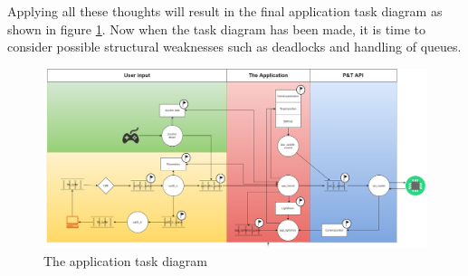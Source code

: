 Applying all these thoughts will result in the final application task diagram as shown in figure \ref{fig:applicaiton_task_diagram}. Now when the task diagram has been made, it is time to consider possible structural weaknesses such as deadlocks and handling of queues. 

\begin{figure}
	\centering
	\includegraphics[scale= 0.4, angle = 90] {Billeder/microcontroller-Task-Diagram}
	\caption{The application task diagram}
	\label{fig:applicaiton_task_diagram}
\end{figure}